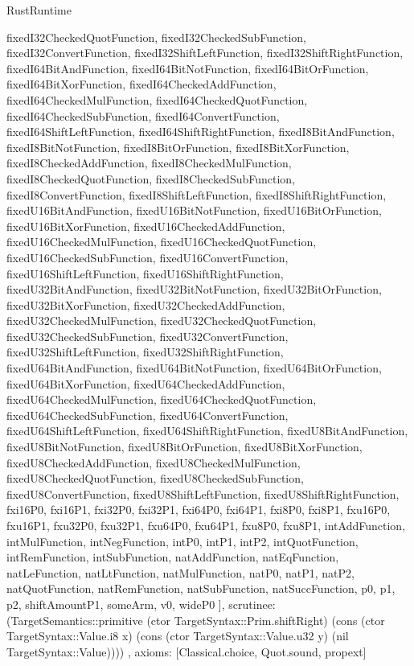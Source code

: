 \begin{lexlean}{RustRuntime}
\begin{semanticmodule}
{{      fixedI32CheckedQuotFunction,
      fixedI32CheckedSubFunction,
      fixedI32ConvertFunction,
      fixedI32ShiftLeftFunction,
      fixedI32ShiftRightFunction,
      fixedI64BitAndFunction,
      fixedI64BitNotFunction,
      fixedI64BitOrFunction,
      fixedI64BitXorFunction,
      fixedI64CheckedAddFunction,
      fixedI64CheckedMulFunction,
      fixedI64CheckedQuotFunction,
      fixedI64CheckedSubFunction,
      fixedI64ConvertFunction,
      fixedI64ShiftLeftFunction,
      fixedI64ShiftRightFunction,
      fixedI8BitAndFunction,
      fixedI8BitNotFunction,
      fixedI8BitOrFunction,
      fixedI8BitXorFunction,
      fixedI8CheckedAddFunction,
      fixedI8CheckedMulFunction,
      fixedI8CheckedQuotFunction,
      fixedI8CheckedSubFunction,
      fixedI8ConvertFunction,
      fixedI8ShiftLeftFunction,
      fixedI8ShiftRightFunction,
      fixedU16BitAndFunction,
      fixedU16BitNotFunction,
      fixedU16BitOrFunction,
      fixedU16BitXorFunction,
      fixedU16CheckedAddFunction,
      fixedU16CheckedMulFunction,
      fixedU16CheckedQuotFunction,
      fixedU16CheckedSubFunction,
      fixedU16ConvertFunction,
      fixedU16ShiftLeftFunction,
      fixedU16ShiftRightFunction,
      fixedU32BitAndFunction,
      fixedU32BitNotFunction,
      fixedU32BitOrFunction,
      fixedU32BitXorFunction,
      fixedU32CheckedAddFunction,
      fixedU32CheckedMulFunction,
      fixedU32CheckedQuotFunction,
      fixedU32CheckedSubFunction,
      fixedU32ConvertFunction,
      fixedU32ShiftLeftFunction,
      fixedU32ShiftRightFunction,
      fixedU64BitAndFunction,
      fixedU64BitNotFunction,
      fixedU64BitOrFunction,
      fixedU64BitXorFunction,
      fixedU64CheckedAddFunction,
      fixedU64CheckedMulFunction,
      fixedU64CheckedQuotFunction,
      fixedU64CheckedSubFunction,
      fixedU64ConvertFunction,
      fixedU64ShiftLeftFunction,
      fixedU64ShiftRightFunction,
      fixedU8BitAndFunction,
      fixedU8BitNotFunction,
      fixedU8BitOrFunction,
      fixedU8BitXorFunction,
      fixedU8CheckedAddFunction,
      fixedU8CheckedMulFunction,
      fixedU8CheckedQuotFunction,
      fixedU8CheckedSubFunction,
      fixedU8ConvertFunction,
      fixedU8ShiftLeftFunction,
      fixedU8ShiftRightFunction,
      fxi16P0,
      fxi16P1,
      fxi32P0,
      fxi32P1,
      fxi64P0,
      fxi64P1,
      fxi8P0,
      fxi8P1,
      fxu16P0,
      fxu16P1,
      fxu32P0,
      fxu32P1,
      fxu64P0,
      fxu64P1,
      fxu8P0,
      fxu8P1,
      intAddFunction,
      intMulFunction,
      intNegFunction,
      intP0,
      intP1,
      intP2,
      intQuotFunction,
      intRemFunction,
      intSubFunction,
      natAddFunction,
      natEqFunction,
      natLeFunction,
      natLtFunction,
      natMulFunction,
      natP0,
      natP1,
      natP2,
      natQuotFunction,
      natRemFunction,
      natSubFunction,
      natSuccFunction,
      p0,
      p1,
      p2,
      shiftAmountP1,
      someArm,
      v0,
      wideP0
    ],
    scrutinee: (TargetSemantics::primitive (ctor TargetSyntax::Prim.shiftRight) (cons (ctor TargetSyntax::Value.i8 x) (cons (ctor TargetSyntax::Value.u32 y) (nil TargetSyntax::Value))))
  },
  axioms: [Classical.choice, Quot.sound, propext]
}


\end{semanticmodule}
\end{lexlean}

